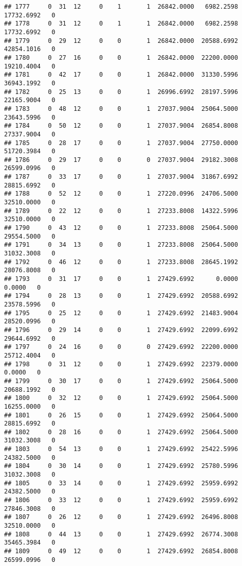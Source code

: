 \documentclass[
]{article}
\begin{document}
\begin{enumerate}
\begin{verbatim}
## 1777     0  31  12     0    1       1  26842.0000   6982.2598  17732.6992   0
## 1778     0  31  12     0    1       1  26842.0000   6982.2598  17732.6992   0
## 1779     0  29  12     0    0       1  26842.0000  20588.6992  42854.1016   0
## 1780     0  27  16     0    0       1  26842.0000  22200.0000  19210.4004   0
## 1781     0  42  17     0    0       1  26842.0000  31330.5996  36943.1992   0
## 1782     0  25  13     0    0       1  26996.6992  28197.5996  22165.9004   0
## 1783     0  48  12     0    0       1  27037.9004  25064.5000  23643.5996   0
## 1784     0  50  12     0    0       1  27037.9004  26854.8008  27337.9004   0
## 1785     0  28  17     0    0       1  27037.9004  27750.0000  51720.3984   0
## 1786     0  29  17     0    0       0  27037.9004  29182.3008  26599.0996   0
## 1787     0  33  17     0    0       1  27037.9004  31867.6992  28815.6992   0
## 1788     0  52  12     0    0       1  27220.0996  24706.5000  32510.0000   0
## 1789     0  22  12     0    0       1  27233.8008  14322.5996  32510.0000   0
## 1790     0  43  12     0    0       1  27233.8008  25064.5000  29554.5000   0
## 1791     0  34  13     0    0       1  27233.8008  25064.5000  31032.3008   0
## 1792     0  46  12     0    0       1  27233.8008  28645.1992  28076.8008   0
## 1793     0  31  17     0    0       1  27429.6992      0.0000      0.0000   0
## 1794     0  28  13     0    0       1  27429.6992  20588.6992  23578.5996   0
## 1795     0  25  12     0    0       1  27429.6992  21483.9004  28520.0996   0
## 1796     0  29  14     0    0       1  27429.6992  22099.6992  29644.6992   0
## 1797     0  24  16     0    0       0  27429.6992  22200.0000  25712.4004   0
## 1798     0  31  12     0    0       1  27429.6992  22379.0000      0.0000   0
## 1799     0  30  17     0    0       1  27429.6992  25064.5000  20688.1992   0
## 1800     0  32  12     0    0       1  27429.6992  25064.5000  16255.0000   0
## 1801     0  26  15     0    0       1  27429.6992  25064.5000  28815.6992   0
## 1802     0  28  16     0    0       1  27429.6992  25064.5000  31032.3008   0
## 1803     0  54  13     0    0       1  27429.6992  25422.5996  24382.5000   0
## 1804     0  30  14     0    0       1  27429.6992  25780.5996  31032.3008   0
## 1805     0  33  14     0    0       1  27429.6992  25959.6992  24382.5000   0
## 1806     0  33  12     0    0       1  27429.6992  25959.6992  27846.3008   0
## 1807     0  26  12     0    0       1  27429.6992  26496.8008  32510.0000   0
## 1808     0  44  13     0    0       1  27429.6992  26774.3008  35465.3984   0
## 1809     0  49  12     0    0       1  27429.6992  26854.8008  26599.0996   0

\end{verbatim}
\end{enumerate}
\end{document}
